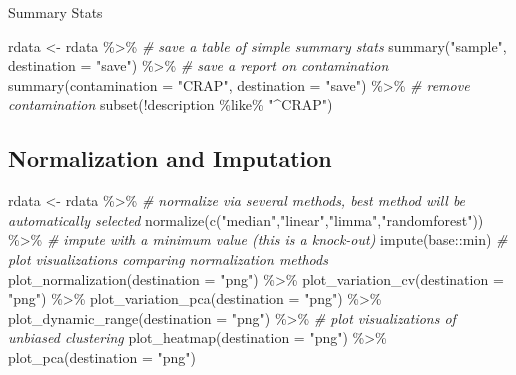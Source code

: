 \documentclass[
]{book}
\newenvironment{Shaded}{\begin{snugshade}}{\end{snugshade}}
\newcommand{\AttributeTok}[1]{\textcolor[rgb]{0.77,0.63,0.00}{#1}}
\newcommand{\CommentTok}[1]{\textcolor[rgb]{0.56,0.35,0.01}{\textit{#1}}}
\newcommand{\FunctionTok}[1]{\textcolor[rgb]{0.00,0.00,0.00}{#1}}
\newcommand{\NormalTok}[1]{#1}
\newcommand{\OtherTok}[1]{\textcolor[rgb]{0.56,0.35,0.01}{#1}}
\newcommand{\SpecialCharTok}[1]{\textcolor[rgb]{0.00,0.00,0.00}{#1}}
\newcommand{\StringTok}[1]{\textcolor[rgb]{0.31,0.60,0.02}{#1}}
\begin{document}
Summary Stats

\begin{Shaded}
\begin{Highlighting}[]
\NormalTok{rdata }\OtherTok{\textless{}{-}}\NormalTok{ rdata }\SpecialCharTok{\%\textgreater{}\%}
  \CommentTok{\# save a table of simple summary stats}
  \FunctionTok{summary}\NormalTok{(}\StringTok{"sample"}\NormalTok{, }\AttributeTok{destination =} \StringTok{"save"}\NormalTok{) }\SpecialCharTok{\%\textgreater{}\%}
  \CommentTok{\# save a report on contamination}
  \FunctionTok{summary}\NormalTok{(}\AttributeTok{contamination =} \StringTok{"CRAP"}\NormalTok{, }\AttributeTok{destination =} \StringTok{"save"}\NormalTok{) }\SpecialCharTok{\%\textgreater{}\%}
  \CommentTok{\# remove contamination}
  \FunctionTok{subset}\NormalTok{(}\SpecialCharTok{!}\NormalTok{description }\SpecialCharTok{\%like\%} \StringTok{"\^{}CRAP"}\NormalTok{)}
\end{Highlighting}
\end{Shaded}

\hypertarget{normalization-and-imputation}{%
\subsection{Normalization and Imputation}\label{normalization-and-imputation}}

\begin{Shaded}
\begin{Highlighting}[]
\NormalTok{rdata }\OtherTok{\textless{}{-}}\NormalTok{ rdata }\SpecialCharTok{\%\textgreater{}\%}
  \CommentTok{\# normalize via several methods, best method will be automatically selected}
  \FunctionTok{normalize}\NormalTok{(}\FunctionTok{c}\NormalTok{(}\StringTok{"median"}\NormalTok{,}\StringTok{"linear"}\NormalTok{,}\StringTok{"limma"}\NormalTok{,}\StringTok{"randomforest"}\NormalTok{)) }\SpecialCharTok{\%\textgreater{}\%}
  \CommentTok{\# impute with a minimum value (this is a knock{-}out)}
  \FunctionTok{impute}\NormalTok{(base}\SpecialCharTok{::}\NormalTok{min)}
  \CommentTok{\# plot visualizations comparing normalization methods}
  \FunctionTok{plot\_normalization}\NormalTok{(}\AttributeTok{destination =} \StringTok{"png"}\NormalTok{) }\SpecialCharTok{\%\textgreater{}\%}
  \FunctionTok{plot\_variation\_cv}\NormalTok{(}\AttributeTok{destination =} \StringTok{"png"}\NormalTok{) }\SpecialCharTok{\%\textgreater{}\%} 
  \FunctionTok{plot\_variation\_pca}\NormalTok{(}\AttributeTok{destination =} \StringTok{"png"}\NormalTok{) }\SpecialCharTok{\%\textgreater{}\%}
  \FunctionTok{plot\_dynamic\_range}\NormalTok{(}\AttributeTok{destination =} \StringTok{"png"}\NormalTok{) }\SpecialCharTok{\%\textgreater{}\%}
  \CommentTok{\# plot visualizations of unbiased clustering}
  \FunctionTok{plot\_heatmap}\NormalTok{(}\AttributeTok{destination =} \StringTok{"png"}\NormalTok{) }\SpecialCharTok{\%\textgreater{}\%}
  \FunctionTok{plot\_pca}\NormalTok{(}\AttributeTok{destination =} \StringTok{"png"}\NormalTok{)}
\end{Highlighting}
\end{Shaded}
\end{document}
